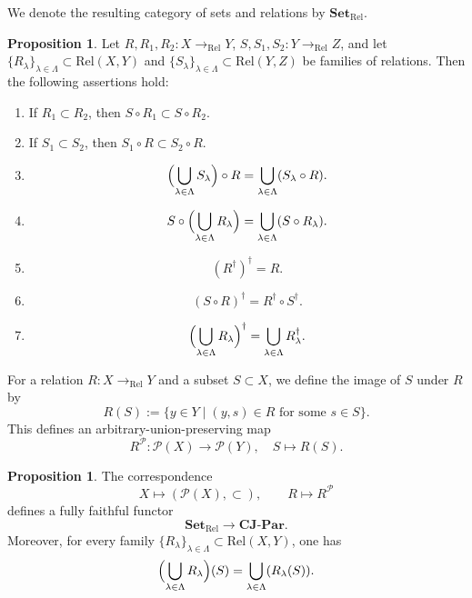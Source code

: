 \documentclass[12pt, a4paper]{amsart}
\theoremstyle{definition}
\newtheorem{proposition}[theorem]{Proposition}
\newcommand{\Rel}{\mathrm{Rel}}
\newcommand{\CompJoinParOrd}{\mathbf{CJ}\text{-}\mathbf{Par}}
\newcommand{\Set}{{\mathbf{Set}}}
\begin{document}
We denote the resulting category of sets and relations by $\Set_{\Rel}$.

\begin{proposition}
Let
$R,R_1,R_2:X\rightarrow_{\Rel}Y$,
$S,S_1,S_2:Y\rightarrow_{\Rel}Z$,
and let
$\{R_\lambda\}_{\lambda\in\Lambda}\subset\Rel(X,Y)$ and
$\{S_\lambda\}_{\lambda\in\Lambda}\subset\Rel(Y,Z)$
be families of relations.
Then the following assertions hold:
\begin{enumerate}
\item
If $R_1\subset R_2$, then
$S\circ R_1\subset S\circ R_2$.

\item
If $S_1\subset S_2$, then
$S_1\circ R\subset S_2\circ R$.

\item
\[
\Bigl(
\bigcup_{\lambda\in\Lambda}
S_\lambda
\Bigr)
\circ R
=
\bigcup_{\lambda\in\Lambda}
(S_\lambda\circ R).
\]

\item
\[
S\circ
\Bigl(
\bigcup_{\lambda\in\Lambda}
R_\lambda
\Bigr)
=
\bigcup_{\lambda\in\Lambda}
(S\circ R_\lambda).
\]

\item
\[
(R^\dagger)^\dagger=R.
\]

\item
\[
(S\circ R)^\dagger
=
R^\dagger\circ S^\dagger.
\]

\item
\[
\Bigl(
\bigcup_{\lambda\in\Lambda}
R_\lambda
\Bigr)^\dagger
=
\bigcup_{\lambda\in\Lambda}
R_\lambda^\dagger.
\]
\end{enumerate}
\end{proposition}


For a relation $R:X\rightarrow_{\Rel}Y$ and a subset $S\subset X$, we define
the image of $S$ under $R$ by
\[
R(S)
:=
\{
y\in Y
\mid
(y,s)\in R
\text{ for some }
s\in S
\}.
\]
This defines an arbitrary-union-preserving map
\[
R^{\mathcal{P}}
:
\mathcal{P}(X)
\rightarrow
\mathcal{P}(Y),
\quad
S\mapsto R(S).
\]

\begin{proposition}\label{proposition:eta^P_functorial}
The correspondence
\[
X\mapsto (\mathcal{P}(X), \subset),
\qquad
R\mapsto R^{\mathcal{P}}
\]
defines a fully faithful functor
\[
\Set_{\Rel}
\rightarrow
\CompJoinParOrd.
\]
Moreover, for every family
$\{R_\lambda\}_{\lambda\in\Lambda}\subset\Rel(X,Y)$,
one has
\[
\Bigl(
\bigcup_{\lambda\in\Lambda}
R_\lambda
\Bigr)(S)
=
\bigcup_{\lambda\in\Lambda}
(R_\lambda(S)).
\]
\end{proposition}
\end{document}

